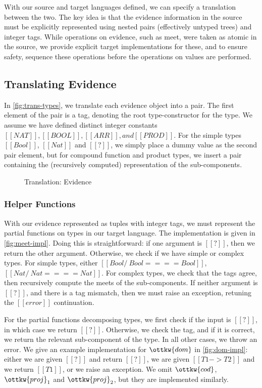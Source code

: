 \documentclass[11pt]{article}
\begin{document}
With our source and target languages defined, we can specify a translation between the two.
The key idea is that the evidence information in the source must be explicitly represented
using nested pairs (effectively untyped trees) and integer tags. While operations on evidence,
such as meet, were taken as atomic in the source, we provide explicit target implementations for these,
and to ensure safety, sequence these operations before the operations on values are performed.

\subsection{Translating Evidence}

In \autoref{fig:trans-types}, we translate each evidence object into a pair.
The first element of the pair is a tag, denoting the root type-constructor for the type.
We assume we have defined distinct integer constants $[[NAT]], [[BOOL]], [[ARR]], and [[PROD]]$.
For the simple types $[[Bool]]$, $[[Nat]]$ and $[[?]]$, we simply place a dummy value as the second pair element,
but for compound function and product types, we insert a pair containing the (recursively computed) representation
of the sub-components. 

\begin{figure}[H]
	\ottdefnEvTransform
	\caption{Translation: Evidence}
	\label{fig:trans-types}
\end{figure}

\subsubsection{Helper Functions}

With our evidence represented as tuples with integer tags, we must represent the partial functions
on types in our target language.
The implementation is given in \autoref{fig:meet-impl}.
Doing this is straightforward: if one argument is $[[?]]$,
then we return the other argument. Otherwise, we check if we have simple or complex types.
For simple types, either $[[Bool /\ Bool ==== Bool]]$, $[[Nat /\ Nat ==== Nat]]$.
For complex types, we check that the tags agree, then recursively compute the meets of the sub-components.
If neither argument is $[[?]]$, and there is a tag mismatch, then we must raise an exception, retuning the $[[error]]$
continuation.

For the partial functions decomposing types, we first check if the input is $[[?]]$,
in which case we return $[[?]]$. Otherwise, we check the tag, and if it is correct, we return
the relevant sub-component of the type. In all other cases, we throw an error.
We give an example implementation for $\ottkw{dom}$ in \autoref{fig:dom-impl}: either we are given $[[?]]$
and return $[[?]]$, we are given $[[T1 -> T2]]$ and we return $[[T1]]$, or we raise an exception.
We omit $\ottkw{cod}$, $\ottkw{proj}_1$ and $\ottkw{proj}_2$, but they are implemented similarly.
\end{document}
